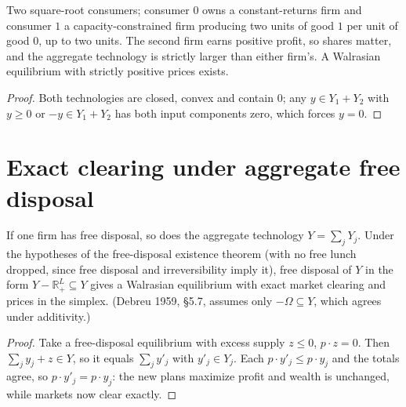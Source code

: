 \begin{theorem}
\label{thm:two_firm_economy}
\leanok
{}
Two square-root consumers; consumer $0$ owns a constant-returns firm and consumer $1$ a capacity-constrained firm producing
two units of good $1$ per unit of good $0$, up to two units. The second firm earns positive profit, so shares matter, and
the aggregate technology is strictly larger than either firm's. A Walrasian equilibrium with strictly positive prices
exists.
\end{theorem}
\begin{proof}
\leanok
Both technologies are closed, convex and contain $0$; any $y \in Y_1 + Y_2$ with $y \ge 0$ or $-y \in Y_1 + Y_2$ has
both input components zero, which forces $y = 0$.
\end{proof}

\section{Exact clearing under aggregate free disposal}
\label{sec:aggregate_disposal}

\begin{theorem}
\label{thm:existence_agg_fd}
\leanok
{}
If one firm has free disposal, so does the aggregate technology $Y = \sum_j Y_j$. Under the hypotheses of the
free-disposal existence theorem (with no free lunch dropped, since free disposal and irreversibility imply it), free
disposal of $Y$ in the form $Y - \mathbb{R}^L_+ \subseteq Y$ gives a Walrasian equilibrium with exact market clearing and
prices in the simplex. (Debreu 1959, \S5.7, assumes only $-\Omega \subseteq Y$, which agrees under additivity.)
\end{theorem}
\begin{proof}
\leanok
Take a free-disposal equilibrium with excess supply $z \le 0$, $p \cdot z = 0$. Then $\sum_j y_j + z \in Y$, so it equals
$\sum_j y'_j$ with $y'_j \in Y_j$. Each $p \cdot y'_j \le p \cdot y_j$ and the totals agree, so $p \cdot y'_j = p \cdot y_j$:
the new plans maximize profit and wealth is unchanged, while markets now clear exactly.
\end{proof}

